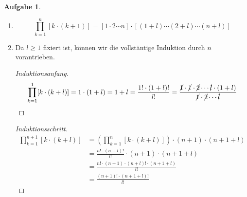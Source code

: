 \documentclass{article}
\theoremstyle{definition}
\newtheorem{ub}{Aufgabe}
\begin{document}
\begin{ub}
	\begin{enumerate}
		\item \[ 
		\prod\limits_{k=1}^n [ k \cdot (k+1) ] = [1 \cdot 2 \cdots n]\cdot[(1+l)\cdots (2 + l)
		\cdots (n + l)]
		 \]
		\item 
		Da $ l \geq 1 $ fixiert ist, k\"onnen wir die vollst\"antige Induktion durch $ n $ vorantrieben. 
		\begin{proof}[Induktionsanfang]
			\[ 
			\prod\limits_{k=1}^1 [ k \cdot (k+l) ] = 1 \cdot (1 + l) = 1 + l = \frac{1! \cdot (1+l)!}{l!} = \frac{\cancel{1} \cdot \cancel{1} \cdot \cancel{2} \cdots \cancel{l} \cdot (1+l)}{\cancel{1} \cdot \cancel{2} \cdots \cancel{l}} 	
			 \]
		\end{proof}
		\begin{proof}[Induktionsschritt]
			\begin{align*}
				\prod\limits_{k=1}^{n+1} [ k \cdot (k+l) ] & = \left( \prod\limits_{k=1}^{n} [ k \cdot (k+l) ] \right) \cdot (n+1)\cdot(n+1+l) \\
				& = \frac{n! \cdot (n+l)!}{l!} \cdot (n+1)\cdot (n+1+l) \\
				& = \frac{n!\cdot (n+1) \cdot (n+l)!\cdot (n+1+l)}{l!} \\
				& = \frac{(n+1)! \cdot (n+1+l)!}{l!}
			\end{align*}
		\end{proof}
	\end{enumerate}
\end{ub}
\end{document}
